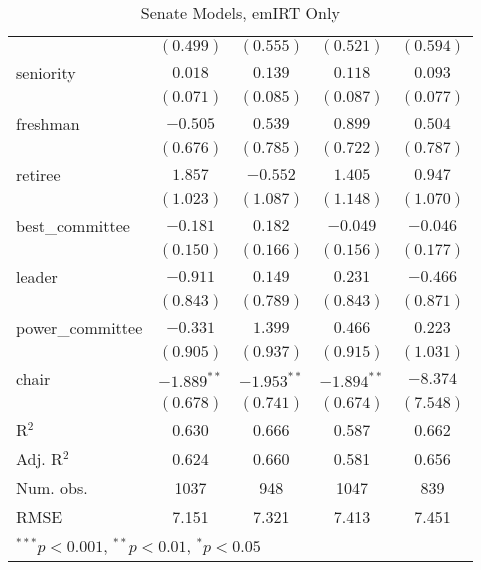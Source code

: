 \documentclass[12pt]{article}
\begin{document}
\begin{table}
\begin{center}
\begin{tabular}{l c c c c }
			& $(0.499)$      & $(0.555)$     & $(0.521)$      & $(0.594)$      \\
			seniority              & $0.018$        & $0.139$       & $0.118$        & $0.093$        \\
			& $(0.071)$      & $(0.085)$     & $(0.087)$      & $(0.077)$      \\
			freshman               & $-0.505$       & $0.539$       & $0.899$        & $0.504$        \\
			& $(0.676)$      & $(0.785)$     & $(0.722)$      & $(0.787)$      \\
			retiree                & $1.857$        & $-0.552$      & $1.405$        & $0.947$        \\
			& $(1.023)$      & $(1.087)$     & $(1.148)$      & $(1.070)$      \\
			best\_committee        & $-0.181$       & $0.182$       & $-0.049$       & $-0.046$       \\
			& $(0.150)$      & $(0.166)$     & $(0.156)$      & $(0.177)$      \\
			leader                 & $-0.911$       & $0.149$       & $0.231$        & $-0.466$       \\
			& $(0.843)$      & $(0.789)$     & $(0.843)$      & $(0.871)$      \\
			power\_committee       & $-0.331$       & $1.399$       & $0.466$        & $0.223$        \\
			& $(0.905)$      & $(0.937)$     & $(0.915)$      & $(1.031)$      \\
			chair                  & $-1.889^{**}$  & $-1.953^{**}$ & $-1.894^{**}$  & $-8.374$       \\
			& $(0.678)$      & $(0.741)$     & $(0.674)$      & $(7.548)$      \\
			\hline
			R$^2$                  & 0.630          & 0.666         & 0.587          & 0.662          \\
			Adj. R$^2$             & 0.624          & 0.660         & 0.581          & 0.656          \\
			Num. obs.              & 1037           & 948           & 1047           & 839            \\
			RMSE                   & 7.151          & 7.321         & 7.413          & 7.451          \\
			\hline
			\multicolumn{5}{l}{\scriptsize{$^{***}p<0.001$, $^{**}p<0.01$, $^*p<0.05$}}
		\end{tabular}
	\caption{Senate Models, emIRT Only}
\end{center}
\end{table}
\end{document}
